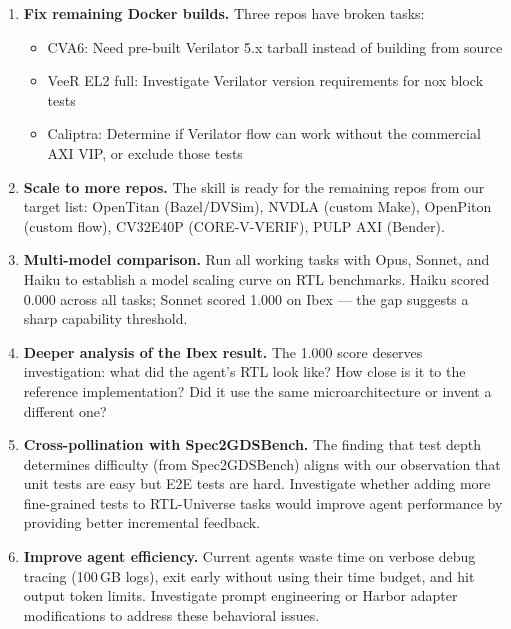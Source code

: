 \documentclass[11pt,a4paper]{article}
\begin{document}
\begin{enumerate}
\item \textbf{Fix remaining Docker builds.} Three repos have broken tasks:
  \begin{itemize}[nosep]
  \item CVA6: Need pre-built Verilator 5.x tarball instead of building from source
  \item VeeR EL2 full: Investigate Verilator version requirements for nox block tests
  \item Caliptra: Determine if Verilator flow can work without the commercial AXI VIP, or exclude those tests
  \end{itemize}

\item \textbf{Scale to more repos.} The skill is ready for the remaining repos from our target list: OpenTitan (Bazel/DVSim), NVDLA (custom Make), OpenPiton (custom flow), CV32E40P (CORE-V-VERIF), PULP AXI (Bender).

\item \textbf{Multi-model comparison.} Run all working tasks with Opus, Sonnet, and Haiku to establish a model scaling curve on RTL benchmarks. Haiku scored 0.000 across all tasks; Sonnet scored 1.000 on Ibex --- the gap suggests a sharp capability threshold.

\item \textbf{Deeper analysis of the Ibex result.} The 1.000 score deserves investigation: what did the agent's RTL look like? How close is it to the reference implementation? Did it use the same microarchitecture or invent a different one?

\item \textbf{Cross-pollination with Spec2GDSBench.} The finding that test depth determines difficulty (from Spec2GDSBench) aligns with our observation that unit tests are easy but E2E tests are hard. Investigate whether adding more fine-grained tests to RTL-Universe tasks would improve agent performance by providing better incremental feedback.

\item \textbf{Improve agent efficiency.} Current agents waste time on verbose debug tracing (100\,GB logs), exit early without using their time budget, and hit output token limits. Investigate prompt engineering or Harbor adapter modifications to address these behavioral issues.
\end{enumerate}

\end{document}
